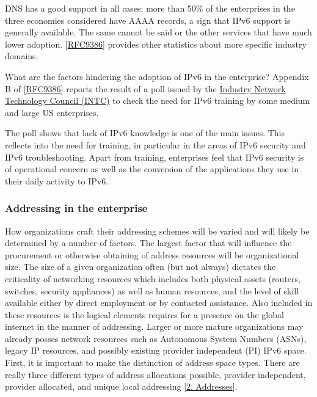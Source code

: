 \documentclass[
]{article}
\begin{document}
DNS has a good support in all cases: more than 50\% of the enterprises
in the three economies considered have AAAA records, a sign that IPv6
support is generally available. The same cannot be said or the other
services that have much lower adoption.
{[}\href{https://www.rfc-editor.org/info/rfc9386}{RFC9386}{]} provides
other statistics about more specific industry domains.

What are the factors hindering the adoption of IPv6 in the enterprise?
Appendix B of
{[}\href{https://www.rfc-editor.org/info/rfc9386}{RFC9386}{]} reports
the result of a poll issued by the
\href{https://industrynetcouncil.org/}{Industry Network Technology
Council (INTC)} to check the need for IPv6 training by some medium and
large US enterprises.

The poll shows that lack of IPv6 knowledge is one of the main issues.
This reflects into the need for training, in particular in the areas of
IPv6 security and IPv6 troubleshooting. Apart from training, enterprises
feel that IPv6 security is of operational concern as well as the
conversion of the applications they use in their daily activity to IPv6.

\subsubsection{Addressing in the
enterprise}\label{addressing-in-the-enterprise}

How organizations craft their addressing schemes will be varied and will
likely be determined by a number of factors. The largest factor that
will influence the procurement or otherwise obtaining of address
resources will be organizational size. The size of a given organization
often (but not always) dictates the criticality of networking resources
which includes both physical assets (routers, switches, security
appliances) as well as human resources, and the level of skill available
either by direct employment or by contacted assistance. Also included in
these resources is the logical elements requires for a presence on the
global internet in the manner of addressing. Larger or more mature
organizations may already posses network resources such as Autonomous
System Numbers (ASNs), legacy IP resources, and possibly existing
provider independent (PI) IPv6 space. First, it is important to make the
distinction of address space types. There are really three different
types of address allocations possible, provider independent, provider
allocated, and unique local addressing {[}\hyperref[addresses]{2.
Addresses}{]}.
\end{document}
